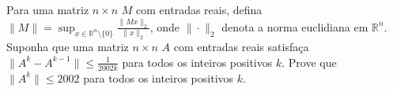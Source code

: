 Para uma matriz \(n\times n\) \(M\) com entradas reais, defina \(\|M\|=\sup_{x\in \mathbb{R}^{n}\setminus\{0\}}\frac{\|Mx\|_{2}}{\|x\|_{2}}\), onde \(\|\cdot\|_{2}\) denota a norma euclidiana em \(\mathbb{R}^{n}\).
Suponha que uma matriz \(n\times n\) \(A\) com entradas reais satisfaça \(\|A^{k}-A^{k-1}\|\leq\frac{1}{2002k}\) para todos os inteiros positivos \(k\).
Prove que \(\|A^{k}\|\leq 2002\) para todos os inteiros positivos \(k\).